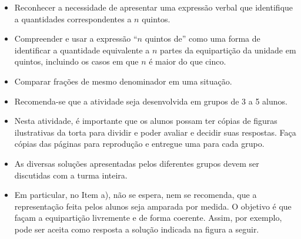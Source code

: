 \begin{atividade}\label{chap2-ativ3}
\objetivos
  \begin{itemize} %
\item Reconhecer a necessidade de apresentar uma expressão verbal que identifique a quantidades correspondentes a $n$ quintos.
\item Compreender e usar a expressão ``$n$ quintos de'' como uma forma de identificar a quantidade equivalente a $n$ partes da equipartição da unidade em quintos, incluindo os casos em que $n$ é maior do que cinco.
\item Comparar frações de mesmo denominador em uma situação.
\end{itemize} %

\discussoes
  \begin{itemize} %
  \item Recomenda-se que a atividade seja desenvolvida em grupos de 3 a 5 alunos.
  \item Nesta atividade, é importante que os alunos possam ter cópias de figuras ilustrativas da torta para dividir e poder avaliar e decidir suas respostas. Faça cópias das páginas para reprodução e entregue uma para cada grupo.
  \item       As diversas soluções apresentadas pelos diferentes grupos devem ser discutidas com a turma inteira.
  \item       Em particular, no Item a), não se espera, nem se recomenda, que a representação feita pelos alunos seja amparada por medida. O objetivo é que façam a equipartição livremente e de forma coerente. Assim, por exemplo, pode ser aceita como resposta a solução indicada na figura a seguir.



\end{itemize}
\end{atividade}
